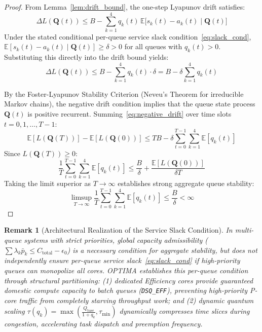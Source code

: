\documentclass[conference]{IEEEtran}
\newtheorem{remark}{Remark}
\begin{document}
\begin{proof}
From Lemma~\ref{lem:drift_bound}, the one-step Lyapunov drift satisfies:
\begin{equation}
\Delta L(\mathbf{Q}(t)) \le B - \sum_{k=1}^4 q_k(t) \, \mathbb{E}\big[ s_k(t) - a_k(t) \;\big|\; \mathbf{Q}(t) \big]
\end{equation}
Under the stated conditional per-queue service slack condition~\eqref{eq:slack_cond}, $\mathbb{E}[s_k(t) - a_k(t) \mid \mathbf{Q}(t)] \ge \delta > 0$ for all queues with $q_k(t) > 0$. Substituting this directly into the drift bound yields:
\begin{equation}
\Delta L(\mathbf{Q}(t)) \le B - \sum_{k=1}^4 q_k(t) \cdot \delta = B - \delta \sum_{k=1}^4 q_k(t)
\end{equation}

By the Foster-Lyapunov Stability Criterion (Neveu's Theorem for irreducible Markov chains), the negative drift condition implies that the queue state process $\mathbf{Q}(t)$ is positive recurrent.
Summing~\eqref{eq:negative_drift} over time slots $t = 0, 1, \dots, T-1$:
\begin{equation}
\mathbb{E}[L(\mathbf{Q}(T))] - \mathbb{E}[L(\mathbf{Q}(0))] \le T B - \delta \sum_{t=0}^{T-1} \sum_{k=1}^4 \mathbb{E}[q_k(t)]
\end{equation}
Since $L(\mathbf{Q}(T)) \ge 0$:
\begin{equation}
\frac{1}{T} \sum_{t=0}^{T-1} \sum_{k=1}^4 \mathbb{E}[q_k(t)] \le \frac{B}{\delta} + \frac{\mathbb{E}[L(\mathbf{Q}(0))]}{\delta T}
\end{equation}
Taking the limit superior as $T \to \infty$ establishes strong aggregate queue stability:
\begin{equation}
\limsup_{T \to \infty} \frac{1}{T} \sum_{t=0}^{T-1} \sum_{k=1}^4 \mathbb{E}[q_k(t)] \le \frac{B}{\delta} < \infty
\end{equation}
\end{proof}

\begin{remark}[Architectural Realization of the Service Slack Condition]
In multi-queue systems with strict priorities, global capacity admissibility ($\sum \lambda_k \bar{p}_k \le C_{\mathrm{total}} - \epsilon_0$) is a necessary condition for aggregate stability, but does not independently ensure per-queue service slack~\eqref{eq:slack_cond} if high-priority queues can monopolize all cores. OPTIMA establishes this per-queue condition through structural partitioning:
(1) dedicated Efficiency cores provide guaranteed domestic compute capacity to batch queues (\texttt{DSQ\_EFF}), preventing high-priority P-core traffic from completely starving throughput work; and
(2) dynamic quantum scaling $\tau(q_k) = \max(\frac{Q_{\mathrm{base}}}{1+q_k}, \tau_{\min})$ dynamically compresses time slices during congestion, accelerating task dispatch and preemption frequency.
\end{remark}
\end{document}
